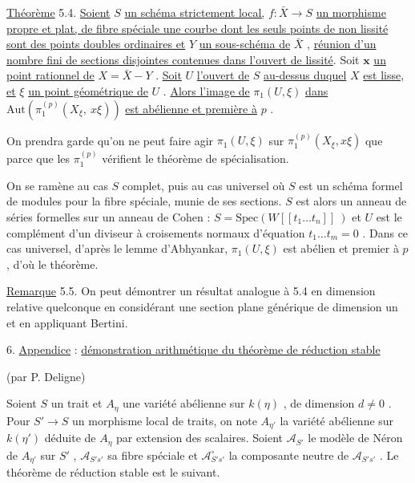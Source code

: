 
\underline{Théorème} 5.4. \underline{Soient} $S$ \underline{un schéma strictement local,} $f : \bar{X} \longrightarrow S$ \underline{un morphisme propre et plat, de fibre spéciale une courbe dont les seuls points de non lissité sont des points doubles ordinaires et} $Y$ \underline{un sous-schéma de} $\bar{X}$ , \underline{réunion d'un nombre fini de sections disjointes contenues dans l'ouvert de lissité}. Soit $\mathbf{x}$ \underline{un point rationnel de} $X = \bar{X} - Y$ . \underline{Soit} $U$ \underline{l'ouvert de} $S$ \underline{au-dessus duquel} $X$ \underline{est lisse, et} $\xi$ \underline{un point géométrique de} $U$ . \underline{Alors l'image de} $\pi_1(U,\xi)$ \underline{dans} $\mathrm{Aut}(\pi_1^{(p)}(X_\xi,\ x\xi))$ \underline{est abélienne et première à} $p$ .

On prendra garde qu'on ne peut faire agir $\pi_1(U,\xi)$ sur $\pi_1^{(p)}(X_\xi,x\xi)$ que parce que les $\pi_1^{(p)}$ vérifient le théorème de spécialisation.

On se ramène au cas $S$ complet, puis au cas universel où $S$ est un schéma formel de modules pour la fibre spéciale, munie de ses sections. $S$ est alors un anneau de séries formelles sur un anneau de Cohen : $S = \mathrm{Spec}(W[[t_1 \ldots t_n]]\ )$ et $U$ est le complément d'un diviseur à croisements normaux d'équation $t_1 \ldots t_m = 0$ . Dans ce cas universel, d'après le lemme d'Abhyankar, $\pi_1(U,\xi)$ est abélien et premier à $p$ , d'où le théorème.

\underline{Remarque} 5.5. On peut démontrer un résultat analogue à 5.4 en dimension relative quelconque en considérant une section plane générique de dimension un et en appliquant Bertini.


6. \underline{Appendice} : \underline{démonstration arithmétique du théorème de réduction stable}

(par P. Deligne)

Soient $S$ un trait et $A_\eta$ une variété abélienne sur $k(\eta)$ , de dimension $d \neq 0$ . Pour $S' \longrightarrow S$ un morphisme local de traits, on note $A_{\eta'}$ la variété abélienne sur $k(\eta')$ déduite de $A_\eta$ par extension des scalaires. Soient $\mathcal{A}_{S'}$ le modèle de Néron de $A_{\eta'}$ sur $S'$ , $\mathcal{A}_{S's'}$ sa fibre spéciale et $\mathcal{A}^{\circ}_{S's'}$ la composante neutre de $\mathcal{A}_{S's'}$ . Le théorème de réduction stable est le suivant.


